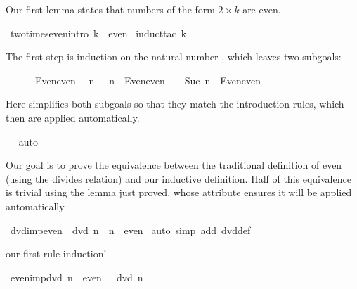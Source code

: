 \begin{isabellebody}
\begin{isamarkuptext}
Our first lemma states that numbers of the form $2\times k$ are even.%
\end{isamarkuptext}%
\isamarkuptrue%
\ two{\isacharunderscore}times{\isacharunderscore}even{\isacharbrackleft}intro{\isacharbang}{\isacharbrackright}{\isacharcolon}\ {\isachardoublequote}{}{\isacharasterisk}k\ {\isasymin}\ even{\isachardoublequote}\isanewline
\isamarkupfalse%
\ {\isacharparenleft}induct{\isacharunderscore}tac\ k{\isacharparenright}\isamarkupfalse%
%
\begin{isamarkuptxt}%
The first step is induction on the natural number , which leaves
two subgoals:
\begin{isabelle}%
\ {}{\isachardot}\ {}\ {\isacharasterisk}\ {}\ {\isasymin}\ Even{\isachardot}even\isanewline
\ {}{\isachardot}\ {\isasymAnd}n{\isachardot}\ {}\ {\isacharasterisk}\ n\ {\isasymin}\ Even{\isachardot}even\ {\isasymLongrightarrow}\ {}\ {\isacharasterisk}\ Suc\ n\ {\isasymin}\ Even{\isachardot}even%
\end{isabelle}
Here  simplifies both subgoals so that they match the introduction
rules, which then are applied automatically.%
\end{isamarkuptxt}%
\ \isamarkuptrue%
\ auto\isanewline
\isamarkupfalse%
\isamarkupfalse%
%
\begin{isamarkuptext}%
Our goal is to prove the equivalence between the traditional definition
of even (using the divides relation) and our inductive definition.  Half of
this equivalence is trivial using the lemma just proved, whose 
attribute ensures it will be applied automatically.%
\end{isamarkuptext}%
\isamarkuptrue%
\ dvd{\isacharunderscore}imp{\isacharunderscore}even{\isacharcolon}\ {\isachardoublequote}{}\ dvd\ n\ {\isasymLongrightarrow}\ n\ {\isasymin}\ even{\isachardoublequote}\isanewline
\isamarkupfalse%
\ {\isacharparenleft}auto\ simp\ add{\isacharcolon}\ dvd{\isacharunderscore}def{\isacharparenright}\isamarkupfalse%
%
\begin{isamarkuptext}%
our first rule induction!%
\end{isamarkuptext}%
\isamarkuptrue%
\ even{\isacharunderscore}imp{\isacharunderscore}dvd{\isacharcolon}\ {\isachardoublequote}n\ {\isasymin}\ even\ {\isasymLongrightarrow}\ {}\ dvd\ n{\isachardoublequote}\isanewline

\end{isabellebody}
